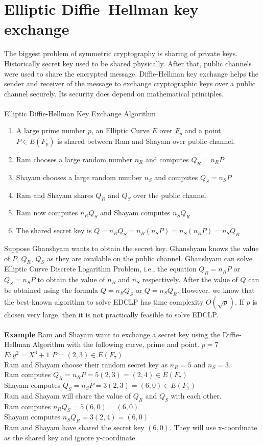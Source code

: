\documentclass[a4paper,12pt]{report}
\begin{document}
\section{Elliptic Diﬃe–Hellman key exchange }
The biggest problem of symmetric cryptography is sharing of private keys. Historically secret key used to be shared physically. After that, public channels were used to share the encrypted message. Diffie-Hellman key exchange helps the sender and receiver of the message to exchange cryptographic keys over a public channel securely. Its security does depend on mathematical principles. \\\\
Elliptic Diﬃe-Hellman Key Exchange Algorithm
\begin{enumerate}
	\item A large prime number $p$, an Elliptic Curve $E$ over $F_p$ and a point $P \in E(F_p)$  is shared between Ram and Shayam over public channel.
	\item Ram chooses a large random number $n_R$ and computes $Q_R = n_R P$
	\item Shayam chooses a large random number $n_S$ and computes $Q_S = n_S P$
	\item Ram and Shayam shares $Q_R$ and $Q_S$ over the public channel.
	\item Ram now computes $n_R Q_S$ and Shayam computes $n_S Q_R$
	\item The shared secret key is $Q=n_R Q_S=n_R (n_S P)=n_S (n_R P)=n_S Q_R$
\end{enumerate}
Suppose Ghanshyam wants to obtain the secret key. Ghanshyam knows the value of $P$, $Q_R$, $Q_S$ as they are available on the public channel. Ghanshyam can solve Elliptic Curve Discrete Logarithm Problem, i.e., the equation $Q_R = n_R P$ or $Q_S = n_S P$ to obtain the value of $n_R$ and $n_S$ respectively. After the value of $Q$ can be obtained using the formula $Q=n_R Q_S$ or $Q=n_S Q_R$. However, we know that the best-known algorithm to solve EDCLP has time complexity $O(\sqrt{p})$. If $p$ is chosen very large, then it is not practically feasible to solve EDCLP.\\\\
\textbf{Example}
Ram and Shayam want to exchange a secret key using the Diffie-Hellman Algorithm with the following curve, prime and point.
$p=7$
$E:y^2=X^3+1$
$P=(2,3) \in E(F_7)$\\
Ram and Shayam choose their random secret key as $n_R=5$ and $n_S=3$.\\
Ram computes $Q_R = n_R P = 5(2,3)=(2,4) \in E(F_7)$\\
Shayam computes $Q_S = n_S P = 3(2,3)=(6,0)\in E(F_7)$\\
Ram and Shayam will share the value of $Q_R$ and $Q_S$ with each other.\\
Ram computes $n_R Q_S= 5 (6,0) = (6,0)$\\
Shayam computes $n_S Q_R= 3 (2,4) = (6,0)$\\
Ram and Shayam have shared the secret key $(6,0)$. They will use x-coordinate as the shared key and ignore y-coordinate.
\end{document}
